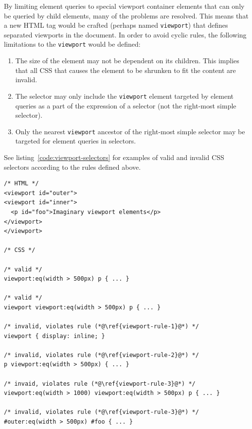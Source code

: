 \documentclass[a4paper,11pt]{kth-mag}
\newcommand{\code}[1]{\texttt{#1}}
\begin{document}
        By limiting element queries to special \gls{viewport} container \glspl{element} that can only be queried by child \glspl{element}, many of the problems are resolved.
        This means that a new \gls{HTML} tag would be crafted (perhaps named \code{viewport}) that defines separated \glspl{viewport} in the \gls{document}.
        In order to avoid cyclic rules, the following limitations to the \code{viewport} would be defined:
        \begin{enumerate}
          \item\label{viewport-rule-1} The size of the \gls{element} may not be dependent on its children. This implies that all \gls{CSS} that causes the \gls{element} to be shrunken to fit the content are invalid.
          \item\label{viewport-rule-2} The selector may only include the \code{viewport} \gls{element} targeted by element queries as a part of the expression of a selector (not the right-most simple selector).
          \item\label{viewport-rule-3} Only the nearest \code{viewport} ancestor of the right-most simple selector may be targeted for element queries in selectors.
        \end{enumerate}
        See listing~\ref{code:viewport-selectors} for examples of valid and invalid CSS selectors according to the rules defined above.
        \begin{lstlisting}[caption={Examples of valid and invalid selectors with the imaginary \code{viewport} element.}, captionpos=b, label={code:viewport-selectors}]
/* HTML */
<viewport id="outer">
<viewport id="inner">
  <p id="foo">Imaginary viewport elements</p>
</viewport>
</viewport>

/* CSS */

/* valid */
viewport:eq(width > 500px) p { ... }

/* valid */
viewport viewport:eq(width > 500px) p { ... }

/* invalid, violates rule (*@\ref{viewport-rule-1}@*) */
viewport { display: inline; }

/* invalid, violates rule (*@\ref{viewport-rule-2}@*) */
p viewport:eq(width > 500px) { ... }

/* invaid, violates rule (*@\ref{viewport-rule-3}@*) */
viewport:eq(width > 1000) viewport:eq(width > 500px) p { ... }

/* invalid, violates rule (*@\ref{viewport-rule-3}@*) */
#outer:eq(width > 500px) #foo { ... }
        \end{lstlisting}        
\end{document}
